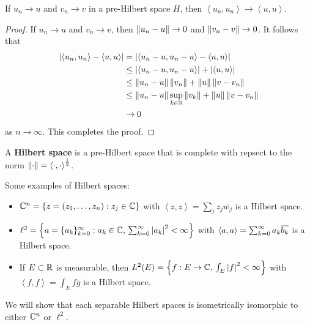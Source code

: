 \documentclass[a4paper]{article}
\renewcommand{\braket}[2]{\left\langle #1, #1 \right\rangle}
\begin{document}
\begin{thm}
If $u_n \to u$ and $v_n \to v$ in a pre-Hilbert space $H$, 
then $\braket{u_n}{v_n} \to \braket{u}{v}$.
\end{thm}

\begin{proof}
  If $u_n \to u$ and $v_n \to v$, then 
  $\left\lVert u_n - u\right\rVert \to 0$ and $\left\lVert v_n - v\right\rVert \to 0$. 
  It follows that 
  \[
  \begin{aligned}
    \abs{\braket{u_n}{v_n} - \braket{u}{v}} 
    &= \abs{\braket{u_n - u}{v_n} - \braket{u}{v - v_n}} \\
    &\leq \abs{\braket{u_n - u}{v_n}} 
    + \abs{\braket{u}{v - v_n}} \\
    &\leq \norm{u_n - u} \norm{v_n} + \norm{u} \norm{v - v_n} \\
    &\leq \norm{u_n - u} \sup_{k \in \N} \norm{v_k} + \norm{u} 
    \norm{v - v_n} \\
    &\to 0 
  \end{aligned}
  \]
  as $n \to \infty$. This completes the proof.
\end{proof}

\begin{defi}
A \textbf{Hilbert space} is a pre-Hilbert space that is 
complete with repsect to the norm 
$\norm{\cdot} = \braket{\cdot}{\cdot}^{\frac{1}{2}}$.
\end{defi}

\begin{eg}
Some examples of Hilbert spaces: 
\begin{itemize}
  \item $\mathbb{C}^n = \left\{ z = (z_1, \dots, z_n) : z_j \in \mathbb{C} \right\}$
  with
  $\braket{z}{w} = \sum_j z_j \bar{w_j}$ is a Hilbert 
  space.

  \item $\ell^2 = \left\{ a = \{ a_k \}_{k=0}^\infty : 
  \text{$a_k \in \mathbb{C}$, $\sum_{k=0}^\infty \left\lvert a_k\right\rvert^2 < \infty$} \right\}$ 
  with
  $\braket{a}{b} = \suminfk a_k \bar{b_k}$ 
  is a Hilbert space.

  \item If $E \subset \mathbb{R}$ is measurable, then 
  $L^2(E) = \left\{ f: \text{$E \to \mathbb{C}$, 
  $\int_E \left\lvert f\right\rvert^2 < \infty$} \right\}$ with 
  $\braket{f}{g} = \int_E f \bar{g}$ is a Hilbert 
  space.
\end{itemize}
We will show that each separable Hilbert spaces is 
isometrically isomorphic to either $\mathbb{C}^n$ or $\ell^2$.
\end{eg}
\end{document}
